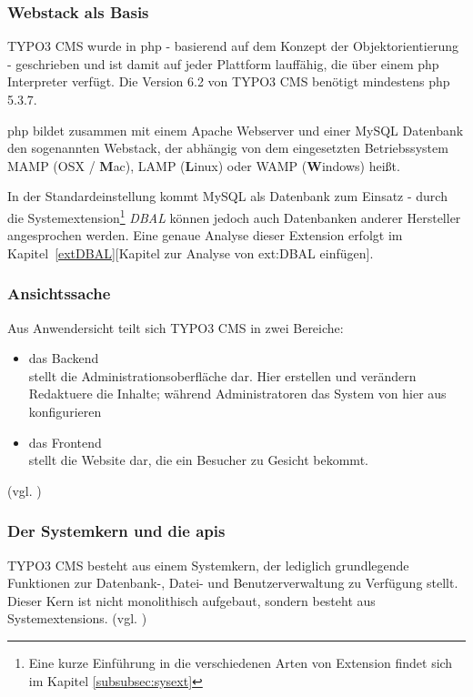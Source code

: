 \subsubsection{Webstack als Basis}

TYPO3 CMS wurde in \gls{php} - basierend auf dem Konzept der Objektorientierung - geschrieben und ist damit auf jeder Plattform lauffähig, die über einem \gls{php} Interpreter verfügt. Die Version 6.2 von TYPO3 CMS benötigt mindestens \gls{php} 5.3.7.

\gls{php} bildet zusammen mit einem Apache Webserver und einer MySQL Datenbank den sogenannten Webstack, der abhängig von dem eingesetzten Betriebssystem MAMP (OSX / {\bfseries M}ac), LAMP ({\bfseries L}inux) oder WAMP ({\bfseries W}indows) heißt.

In der Standardeinstellung kommt MySQL als Datenbank zum Einsatz - durch die Systemextension\footnote{Eine kurze Einführung in die verschiedenen Arten von Extension findet sich im Kapitel \ref{subsubsec:sysext}} \textit{DBAL} können jedoch auch Datenbanken anderer Hersteller angesprochen werden. Eine genaue Analyse dieser Extension erfolgt im Kapitel~\ref{extDBAL}[Kapitel zur Analyse von ext:DBAL einfügen].

\subsubsection{Ansichtssache}
Aus Anwendersicht teilt sich TYPO3 CMS in zwei Bereiche:

\begin{itemize}
	\item das Backend\\
		stellt die Administrationsoberfläche dar. Hier erstellen und verändern Redaktuere die Inhalte; während Administratoren das System von hier aus konfigurieren
	\item das Frontend\\
		stellt die Website dar, die ein Besucher zu Gesicht bekommt.
\end{itemize}
(vgl. \cite[S. 5]{book:dulepovTypo32008})

\subsubsection{Der Systemkern und die \gls{api}s}
\label{basics:typo3:subsubsec:coreAndApi}
TYPO3 CMS besteht aus einem Systemkern, der lediglich grundlegende Funktionen zur Datenbank-, Datei- und Benutzerverwaltung zu Verfügung stellt. Dieser Kern ist nicht monolithisch aufgebaut, sondern besteht aus Systemextensions. (vgl. \cite[S. 32]{book:laborenzTypo32006})

